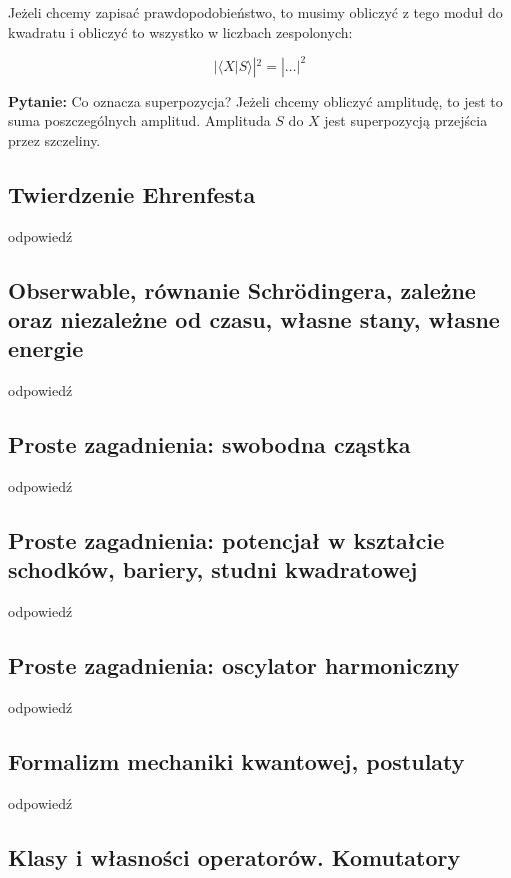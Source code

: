 Jeżeli chcemy zapisać prawdopodobieństwo, to musimy obliczyć z tego moduł do kwadratu i obliczyć to wszystko w liczbach zespolonych:

\[
|\langle X|S \rangle|^2 = |\dots|^2
\]

\textbf{Pytanie:} Co oznacza superpozycja? Jeżeli chcemy obliczyć amplitudę, to jest to suma poszczególnych amplitud. Amplituda $S$ do $X$ jest superpozycją przejścia przez szczeliny.


\subsection{Twierdzenie Ehrenfesta}

odpowiedź

\subsection{Obserwable, równanie Schrödingera, zależne oraz niezależne od czasu, własne stany, własne energie}

odpowiedź

\subsection{Proste zagadnienia: swobodna cząstka}

odpowiedź

\subsection{Proste zagadnienia: potencjał w kształcie schodków, bariery, studni kwadratowej}

odpowiedź

\subsection{Proste zagadnienia: oscylator harmoniczny}

odpowiedź

\subsection{Formalizm mechaniki kwantowej, postulaty}

odpowiedź

\subsection{Klasy i własności operatorów. Komutatory}

